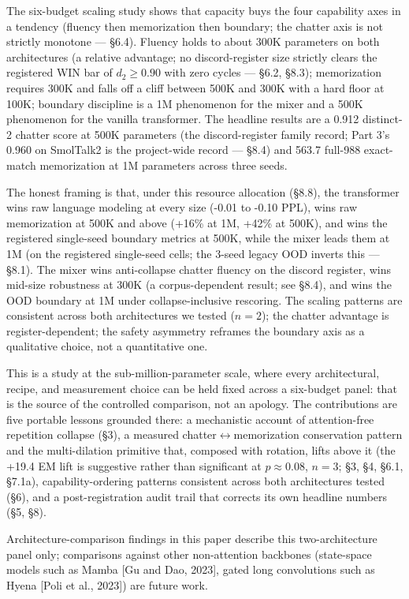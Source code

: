 \documentclass[11pt]{article}
\begin{document}
The six-budget scaling study shows that capacity buys the four capability axes in a tendency (fluency then memorization then boundary; the chatter axis is not strictly monotone --- \S6.4). Fluency holds to about 300K parameters on both architectures (a relative advantage; no discord-register size strictly clears the registered WIN bar of $d_2 \geq 0.90$ with zero cycles --- \S6.2, \S8.3); memorization requires 300K and falls off a cliff between 500K and 300K with a hard floor at 100K; boundary discipline is a 1M phenomenon for the mixer and a 500K phenomenon for the vanilla transformer. The headline results are a 0.912 distinct-2 chatter score at 500K parameters (the discord-register family record; Part 3's 0.960 on SmolTalk2 is the project-wide record --- \S8.4) and 563.7 full-988 exact-match memorization at 1M parameters across three seeds.

The honest framing is that, under this resource allocation (\S8.8), the transformer wins raw language modeling at every size (-0.01 to -0.10 PPL), wins raw memorization at 500K and above (+16\% at 1M, +42\% at 500K), and wins the registered single-seed boundary metrics at 500K, while the mixer leads them at 1M (on the registered single-seed cells; the 3-seed legacy OOD inverts this --- \S8.1). The mixer wins anti-collapse chatter fluency on the discord register, wins mid-size robustness at 300K (a corpus-dependent result; see \S8.4), and wins the OOD boundary at 1M under collapse-inclusive rescoring. The scaling patterns are consistent across both architectures we tested ($n = 2$); the chatter advantage is register-dependent; the safety asymmetry reframes the boundary axis as a qualitative choice, not a quantitative one.

This is a study at the sub-million-parameter scale, where every architectural, recipe, and measurement choice can be held fixed across a six-budget panel: that is the source of the controlled comparison, not an apology. The contributions are five portable lessons grounded there: a mechanistic account of attention-free repetition collapse (\S3), a measured chatter$\leftrightarrow$memorization conservation pattern and the multi-dilation primitive that, composed with rotation, lifts above it (the +19.4 EM lift is suggestive rather than significant at $p \approx 0.08$, $n = 3$; \S3, \S4, \S6.1, \S7.1a), capability-ordering patterns consistent across both architectures tested (\S6), and a post-registration audit trail that corrects its own headline numbers (\S5, \S8).

Architecture-comparison findings in this paper describe this two-architecture panel only; comparisons against other non-attention backbones (state-space models such as Mamba [Gu and Dao, 2023], gated long convolutions such as Hyena [Poli et al., 2023]) are future work.
\end{document}
